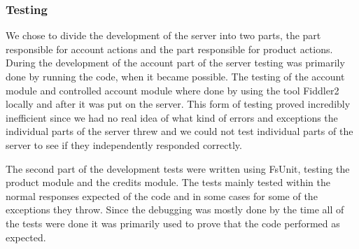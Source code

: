 \subsubsection{Testing}
We chose to divide the development of the server into two parts, the part responsible for account actions and the part responsible for product actions. During the development of the account part of the server testing was primarily done by running the code, when it became possible. The testing of the account module and controlled account module where done by using the tool Fiddler2 locally and after it was put on the server. This form of testing proved incredibly inefficient since we had no real idea of what kind of errors and exceptions the individual parts of the server threw and we could not test individual parts of the server to see if they independently responded correctly.

The second part of the development tests were written using FsUnit, testing the product module and the credits module. The tests mainly tested within the normal responses expected of the code and in some cases for some of the exceptions they throw. Since the debugging was mostly done by the time all of the tests were done it was primarily used to prove that the code performed as expected.